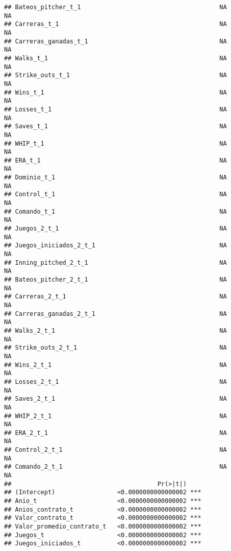 \documentclass[
]{article}
\begin{document}
\begin{verbatim}
## Bateos_pitcher_t_1                                      NA              NA
## Carreras_t_1                                            NA              NA
## Carreras_ganadas_t_1                                    NA              NA
## Walks_t_1                                               NA              NA
## Strike_outs_t_1                                         NA              NA
## Wins_t_1                                                NA              NA
## Losses_t_1                                              NA              NA
## Saves_t_1                                               NA              NA
## WHIP_t_1                                                NA              NA
## ERA_t_1                                                 NA              NA
## Dominio_t_1                                             NA              NA
## Control_t_1                                             NA              NA
## Comando_t_1                                             NA              NA
## Juegos_2_t_1                                            NA              NA
## Juegos_iniciados_2_t_1                                  NA              NA
## Inning_pitched_2_t_1                                    NA              NA
## Bateos_pitcher_2_t_1                                    NA              NA
## Carreras_2_t_1                                          NA              NA
## Carreras_ganadas_2_t_1                                  NA              NA
## Walks_2_t_1                                             NA              NA
## Strike_outs_2_t_1                                       NA              NA
## Wins_2_t_1                                              NA              NA
## Losses_2_t_1                                            NA              NA
## Saves_2_t_1                                             NA              NA
## WHIP_2_t_1                                              NA              NA
## ERA_2_t_1                                               NA              NA
## Control_2_t_1                                           NA              NA
## Comando_2_t_1                                           NA              NA
##                                        Pr(>|t|)    
## (Intercept)                 <0.0000000000000002 ***
## Anio_t                      <0.0000000000000002 ***
## Anios_contrato_t            <0.0000000000000002 ***
## Valor_contrato_t            <0.0000000000000002 ***
## Valor_promedio_contrato_t   <0.0000000000000002 ***
## Juegos_t                    <0.0000000000000002 ***
## Juegos_iniciados_t          <0.0000000000000002 ***

\end{verbatim}
\end{document}
